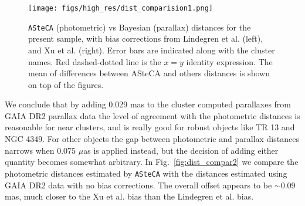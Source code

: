 \documentclass{aa}
\begin{document}

\begin{figure*}[ht]
    \centering
    \texttt{[image: figs/high\_res/dist\_comparision1.png]}
    \caption{\texttt{ASteCA} (photometric) vs Bayesian (parallax) distances for
    the present sample, with bias corrections from Lindegren et al. (left), and
    Xu et al. (right). Error bars are indicated along with the cluster
    names. Red dashed-dotted line is the $x = y$ identity expression. The mean
    of differences between ASteCA and others distances is shown on top of the
    figures.}
    \label{fig67}
\end{figure*}

We conclude that by adding 0.029 mas to the cluster computed parallaxes from
GAIA DR2 parallax data the level of agreement with the photometric distances is
reasonable for near clusters, and is really good for robust objects like
TR 13 and NGC 4349.
For other objects the gap between photometric and parallax distances narrows
when 0.075 $\mu$as is applied instead, but the decision of adding
either quantity becomes somewhat arbitrary.
In Fig.~\ref{fig:dist_compar2} we compare the photometric distances
estimated by \texttt{ASteCA} with the distances estimated using GAIA DR2 data
with no bias corrections. The overall offset
appears to be $\sim0.09$ mas, much closer to the Xu et al. bias than the
Lindegren et al. bias.\\
\end{document}
